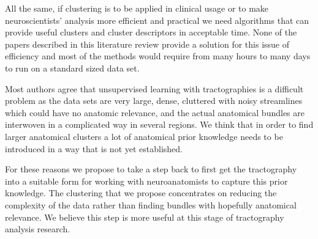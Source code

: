 \documentclass{bioinfo}
\begin{document}
All the same, if clustering is to be applied in clinical usage or to
make neuroscientists' analysis more efficient and practical we need
algorithms that can provide useful clusters and cluster descriptors in
acceptable time. None of the papers described in this literature review
provide a solution for this issue of efficiency and most of the methods
would require from many hours to many days to run on a standard sized
data set.


Most authors agree that unsupervised learning with tractographies is a
difficult problem as the data sets are very large, dense, cluttered with
noisy streamlines which could have no anatomic relevance, and the actual
anatomical bundles are interwoven in a complicated way in several
regions. 
We think that in order to find larger anatomical clusters a lot of
anatomical prior knowledge needs to be introduced in a way that is not
yet established.  

For these reasons we propose to take a step back to first get the
tractography into a suitable form for working with neuroanatomists to
capture this prior knowledge. The clustering that we propose
concentrates on reducing the complexity of the data rather than finding
bundles with hopefully anatomical relevance. We believe this step is
more useful at this stage of tractography analysis research.
\end{document}
